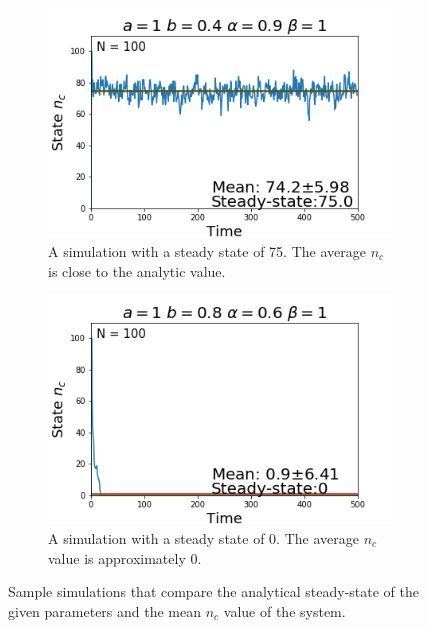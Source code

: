 \begin{figure}[h]
  \centering
  \begin{subfigure}[b]{0.4\linewidth}
    \includegraphics[width=\linewidth]{images/chapter3/ssA.png}
    \caption{A simulation with a steady state of 75. The average $n_{c}$ is close to the analytic value.}
  \end{subfigure}
  \begin{subfigure}[b]{0.4\linewidth}
    \includegraphics[width=\linewidth]{images/chapter3/ssB.png}
    \caption{A simulation with a steady state of 0. The average $n_{c}$ value is approximately $0$.}
  \end{subfigure}
  \caption{Sample simulations that compare the analytical steady-state of the given parameters and the mean $n_{c}$ value of the system.}
  \label{fig:compareSingleSS}
\end{figure}

